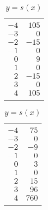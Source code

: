 \begin{exercises}
\begin{problem}
\begin{table}[!htb]
\begin{widepage}
	\hfill
	\begin{subtable}{.2\textwidth}
		\centering
		\caption{$y=r(x)$}
		\label{poly:tab:findformular}
		\begin{tabular}{rr}
			\beforeheading
			\heading{$x$} & \heading{$y$} \\ \afterheading
			$-4$          & $105$         \\\normalline
			$-3$          & $0$           \\\normalline
			$-2$          & $-15$         \\\normalline
			$-1$          & $0$           \\\normalline
			$0$           & $9$           \\\normalline
			$1$           & $0$           \\\normalline
			$2$           & $-15$         \\\normalline
			$3$           & $0$           \\\normalline
			$4$           & $105$         \\\lastline
		\end{tabular}
	\end{subtable}
	\hfill
	\begin{subtable}{.2\textwidth}
		\centering
		\caption{$y=s(x)$}
		\label{poly:tab:findformulas}
		\begin{tabular}{rr}
			\beforeheading
			\heading{$x$} & \heading{$y$} \\ \afterheading
			$-4$          & $75$          \\\normalline
			$-3$          & $0$           \\\normalline
			$-2$          & $-9$          \\\normalline
			$-1$          & $0$           \\\normalline
			$0$           & $3$           \\\normalline
			$1$           & $0$           \\\normalline
			$2$           & $15$          \\\normalline
			$3$           & $96$          \\\normalline
			$4$           & $760$         \\\lastline
		\end{tabular}
	\end{subtable}
	\end{widepage}
\end{table}
 

\end{problem}
\end{exercises}
